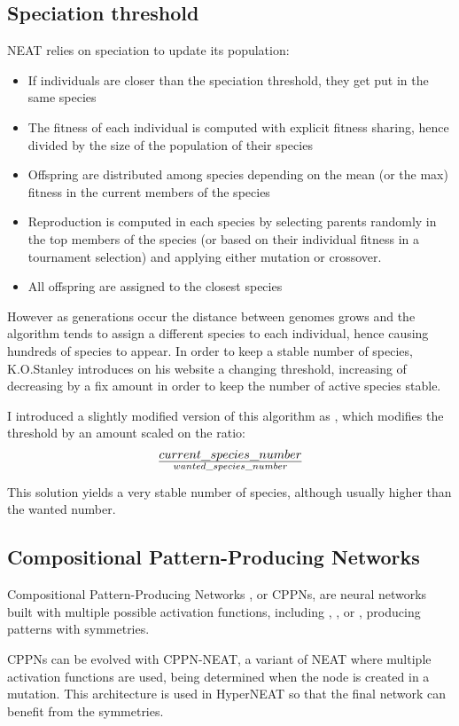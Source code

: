 \subsection{Speciation threshold}
NEAT relies on speciation to update its population:
\begin{itemize}
    \item If individuals are closer than the speciation threshold, they get put in the same species
    \item The fitness of each individual is computed with explicit fitness sharing, hence divided by the size of the population of their species
    \item Offspring are distributed among species depending on the mean (or the max) fitness in the current members of the species
    \item Reproduction is computed in each species by selecting parents randomly in the top members of the species (or based on their individual fitness in a tournament selection) and applying either mutation or crossover.
    \item All offspring are assigned to the closest species
\end{itemize}

However as generations occur the distance between genomes grows and the algorithm tends to assign a different species to each individual, hence causing hundreds of species to appear. In order to keep a stable number of species, K.O.Stanley introduces on his website a changing threshold, increasing of decreasing by a fix amount in order to keep the number of active species stable. 

I introduced a slightly modified version of this algorithm as , which modifies the threshold by an amount scaled on the ratio: $$current\_species\_number \over wanted\_species\_number$$

This solution yields a very stable number of species, although usually higher than the wanted number.

\subsection{Compositional Pattern-Producing Networks}

Compositional Pattern-Producing Networks \cite{CPPN}, or CPPNs, are neural networks built with multiple possible activation functions, including , , or , producing patterns with symmetries. 

CPPNs can be evolved with CPPN-NEAT, a variant of NEAT where multiple activation functions are used, being determined when the node is created in a mutation. This architecture is used in HyperNEAT so that the final network can benefit from the symmetries. 

